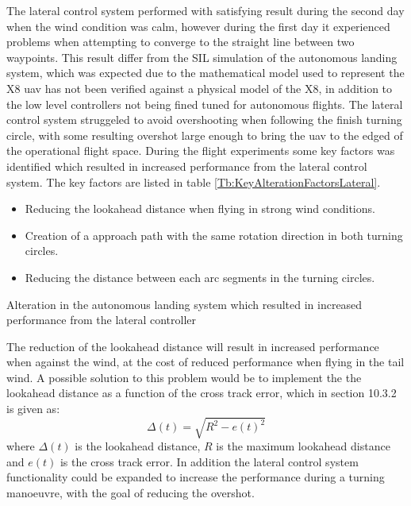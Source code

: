 The lateral control system performed with satisfying result during the second day when the wind condition was calm, however during the first day it experienced problems when attempting to converge to the straight line between two waypoints. This result differ from the SIL simulation of the autonomous landing system, which was expected due to the mathematical model used to represent the X8 \gls{uav} has not been verified against a physical model of the X8, in addition to the low level controllers not being fined tuned for autonomous flights. The lateral control system  struggeled to avoid overshooting when following the finish turning circle, with some resulting overshot large enough to bring the \gls{uav} to the edged of the operational flight space. During the flight experiments some key factors was identified which resulted in increased performance from the lateral control system. The key factors are listed in table \ref{Tb:KeyAlterationFactorsLateral}.
\begin{table}[H]
\begin{itemize}
\item Reducing the lookahead distance when flying in strong wind conditions.
\item Creation of a approach path with the same rotation direction in both turning circles.
\item Reducing the distance between each arc segments in the turning circles.
\end{itemize}
\caption{Alteration in the autonomous landing system which resulted in increased performance from the lateral controller}
\label{Tb:KeyAlterationFactorsLateral}
\end{table}
The reduction of the lookahead distance will result in increased performance when against the wind, at the cost of reduced performance when flying in the tail wind. A possible solution to this problem would be to implement the the lookahead distance as a function of the cross track error, which in \citep{fossen2011handbook} section 10.3.2 is given as:
\begin{equation}
\Delta(t) = \sqrt{R^2 - e(t)^2}
\end{equation}
where $\Delta(t)$ is the lookahead distance, $R$ is the maximum lookahead distance and $e(t)$ is the cross track error. In addition the lateral control system functionality could be expanded to increase the performance during a turning manoeuvre, with the goal of reducing the overshot.

